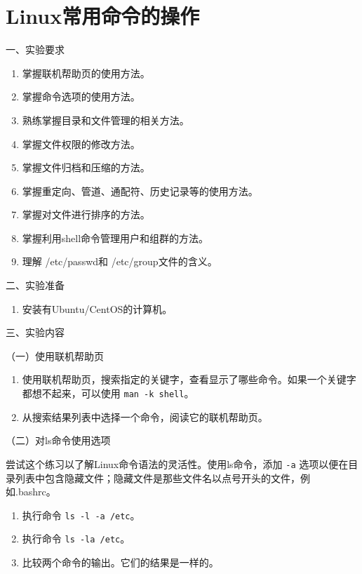 \chapter{Linux常用命令的操作}

\noindent
一、实验要求
\begin{enumerate}
  \item 掌握联机帮助页的使用方法。
  \item 掌握命令选项的使用方法。
  \item 熟练掌握目录和文件管理的相关方法。
  \item 掌握文件权限的修改方法。
  \item 掌握文件归档和压缩的方法。
  \item 掌握重定向、管道、通配符、历史记录等的使用方法。
  \item 掌握对文件进行排序的方法。
  \item 掌握利用shell命令管理用户和组群的方法。
  \item 理解 /etc/passwd和 /etc/group文件的含义。
\end{enumerate}

\vspace{0.2in}
\noindent
二、实验准备
\begin{enumerate}
  \item 安装有Ubuntu/CentOS的计算机。
\end{enumerate}

\vspace{0.2in}
\noindent
三、实验内容

\vspace{0.1in}
（一）使用联机帮助页
\begin{enumerate}
  \item 使用联机帮助页，搜索指定的关键字，查看显示了哪些命令。如果一个关键字都想不起来，可以使用 \verb|man -k shell|。
  \item 从搜索结果列表中选择一个命令，阅读它的联机帮助页。
\end{enumerate}

\vspace{0.1in}
（二）对ls命令使用选项

尝试这个练习以了解Linux命令语法的灵活性。使用ls命令，添加 \verb|-a| 选项以便在目录列表中包含隐藏文件；隐藏文件是那些文件名以点号开头的文件，例如.bashrc。
\begin{enumerate}
  \item 执行命令 \verb|ls -l -a /etc|。
  \item 执行命令 \verb|ls -la /etc|。
  \item 比较两个命令的输出。它们的结果是一样的。
\end{enumerate}

